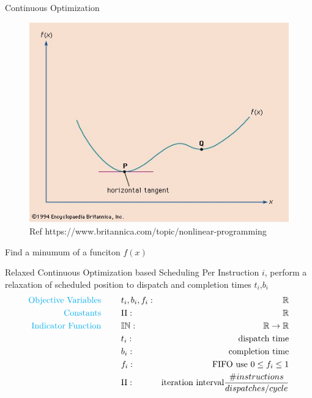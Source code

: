 \documentclass{beamer}
\begin{document}
\begin{darkframes}
\begin{frame}{Continuous Optimization}

  \begin{figure}
    \includegraphics[scale=0.4]{figures/optimization.jpg}
    \caption{Ref https://www.britannica.com/topic/nonlinear-programming}
  \end{figure}
  Find a minumum of a funciton $f(x)$

\end{frame}

\begin{frame}{Relaxed Continuous Optimization based Scheduling}
    Per Instruction $i$, perform a relaxation of scheduled position to dispatch and completion times $t_i$,$b_i$
    \begin{align*}
    \text{\color{cyan} Objective Variables \qquad} & t_i, b_i, f_i:& \mathbb{R} \\
    \text{\color{cyan} Constants \qquad} & \textrm{II} :& \mathbb{R} \\
    \text{\color{cyan} Indicator Function \qquad} & \mathbb{IN} :& \mathbb{R} \rightarrow \mathbb{R} \\
    & t_i :& \text{dispatch time} \\
    & b_i :& \text{completion time} \\
    & f_i :& \text{FIFO use } 0 \leq f_i \leq 1 \\
    & \textrm{II} :& \text{iteration interval} \frac{\# instructions}{dispatches/cycle} \\
    \end{align*}
   
\end{frame}


\end{darkframes}
\end{document}
